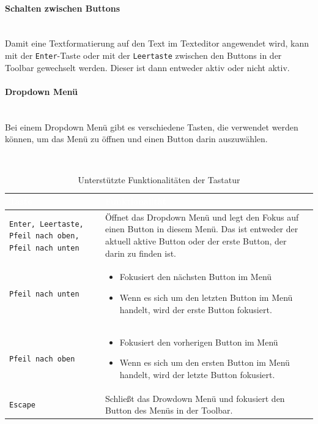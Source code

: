 \paragraph{Schalten zwischen Buttons}\mbox{}\\
Damit eine Textformatierung auf den Text im Texteditor angewendet wird, kann mit der \texttt{Enter}-Taste oder mit 
der \texttt{Leertaste} zwischen den Buttons in der Toolbar gewechselt werden. Dieser ist dann entweder aktiv oder 
nicht aktiv.

\paragraph{Dropdown Menü}\mbox{}\\
Bei einem Dropdown Menü gibt es verschiedene Tasten, die verwendet werden können, um das Menü zu öffnen und einen Button darin auszuwählen.
 
 ~\begin{table}[H]
	\begin{center}
	\begin{tabular}{| m{4cm} | m{10cm} |}
		\hline
 		\cellcolor{Gray}\textcolor{White}{Taste} & \cellcolor{Gray}\textcolor{White}{Funktionalität}  \\
		\hline
		\texttt{Enter, Leertaste, Pfeil nach oben, Pfeil nach unten} & Öffnet das Dropdown Menü und legt den 
			Fokus auf einen Button in diesem Menü. Das ist entweder der aktuell aktive Button oder der erste 
			Button, der darin zu finden ist. \\
		\hline
		\texttt{Pfeil nach unten} &
		\begin{itemize}
			\item Fokusiert den nächsten Button im Menü
			\item Wenn es sich um den letzten Button im Menü handelt, wird der erste Button fokusiert.
		\end{itemize} \\
		\hline
		\texttt{Pfeil nach oben} &
		\begin{itemize}
			\item Fokusiert den vorherigen Button im Menü
			\item Wenn es sich um den ersten Button im Menü handelt, wird der letzte Button fokusiert.
		\end{itemize} \\
		\hline
		\texttt{Escape} & Schließt das Drowdown Menü und fokusiert den Button des Menüs in der Toolbar. \\
		\hline
	\end{tabular}
	\end{center}
	\caption{Unterstützte Funktionalitäten der Tastatur}
\end{table}

